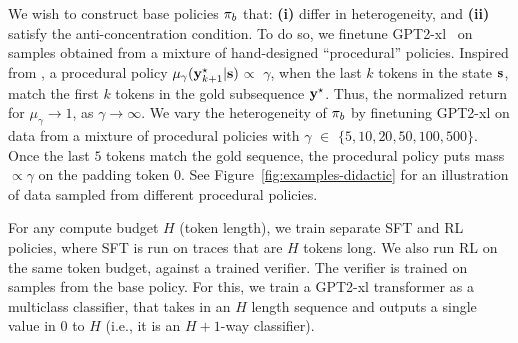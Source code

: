 We wish to construct base policies $\pi_b$ that: \textbf{(i)} differ in heterogeneity, and \textbf{(ii)} satisfy the anti-concentration condition. To do so, we finetune GPT2-xl~\cite{radford2019language} on samples obtained from a mixture of hand-designed ``procedural'' policies. Inspired from \citet{setlur2024rewarding}, a procedural policy $\mu_\gamma (\mathbf{y}^\star_{k+1} | \mathbf{s})$$\propto$ $\gamma$, when the last $k$ tokens in the state $\mathbf{s}$, match the first $k$ tokens in the gold subsequence $\mathbf{y}^\star$.  Thus, the normalized return for $\mu_\gamma$$\rightarrow$$1$, as $\gamma$$\rightarrow$$\infty$. We vary the heterogeneity of $\pi_b$ by finetuning GPT2-xl on data from a mixture of procedural policies with $\gamma $ $\in$ $\{5, 10, 20, 50, 100, 500\}$. 
Once the last $5$ tokens match the gold sequence, the procedural policy puts mass  $\propto \gamma$ on the padding token $0$. 
See Figure~\ref{fig:examples-didactic} for an illustration of data sampled from different procedural policies. 

For any compute budget $H$ (token length), we train separate SFT and RL policies, where SFT is run on traces that are $H$ tokens long. We also run RL on the same token budget, against a trained verifier. The verifier is trained on samples from the base policy. For this, we train a GPT2-xl transformer as a multiclass classifier, that takes in an $H$ length sequence and outputs a single value in $0$ to $H$ (i.e., it is an $H+1$-way classifier). 



